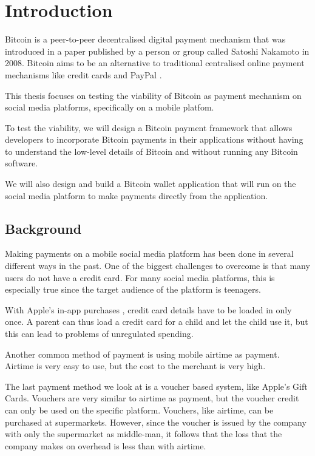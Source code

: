 \chapter{Introduction}
\label{chp:Intro}

Bitcoin \cite{Nakamoto2008} is a peer-to-peer decentralised digital payment mechanism that was introduced in a paper published by a person or group called Satoshi Nakamoto in 2008. Bitcoin aims to be an alternative to traditional centralised online payment mechanisms like credit cards and PayPal \cite{PayPal2015}. 

This thesis focuses on testing the viability of Bitcoin as payment mechanism on social media platforms, specifically on a mobile platfom. 

To test the viability, we will design a Bitcoin payment framework that allows developers to incorporate Bitcoin payments in their applications without having to understand the low-level details of Bitcoin and without running any Bitcoin software.

We will also design and build a Bitcoin wallet application that will run on the social media platform to make payments directly from the application. 


\section{Background}

Making payments on a mobile social media platform has been done in several different ways in the past. One of the biggest challenges to overcome is that many users do not have a credit card. For many social media platforms, this is especially true since the target audience of the platform is teenagers. 

With Apple's in-app purchases \cite{apple}, credit card details have to be loaded in only once. A parent can thus load a credit card for a child and let the child use it, but this can lead to problems of unregulated spending.

Another common method of payment is using mobile airtime as payment. Airtime is very easy to use, but the cost to the merchant is very high.

The last payment method we look at is a voucher based system, like Apple's Gift Cards. Vouchers are very similar to airtime as payment, but the voucher credit can only be used on the specific platform. Vouchers, like airtime, can be purchased at supermarkets. However, since the voucher is issued by the company with only the supermarket as middle-man, it follows that the loss that the company makes on overhead is less than with airtime.

